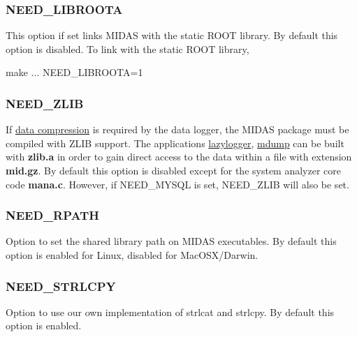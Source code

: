 \label{BuildingOptions_idx_LIBROOTA}
\hypertarget{BuildingOptions_idx_LIBROOTA}{}
 \label{BuildingOptions_idx_ROOT_static-library}
\hypertarget{BuildingOptions_idx_ROOT_static-library}{}
 

\hypertarget{BuildingOptions_BO_NEED_LIBROOTA}{}\subsubsection{NEED\_\-LIBROOTA}\label{BuildingOptions_BO_NEED_LIBROOTA}
This option if set links MIDAS with the static ROOT library. By default this option is disabled. To link with the static ROOT library, \par
make ... NEED\_\-LIBROOTA=1

\label{BuildingOptions_idx_ZLIB_build-flag}
\hypertarget{BuildingOptions_idx_ZLIB_build-flag}{}
 

 \hypertarget{BuildingOptions_BO_NEED_ZLIB}{}\subsubsection{NEED\_\-ZLIB}\label{BuildingOptions_BO_NEED_ZLIB}
If \hyperlink{F_Logging_Data_F_Logger_CS_Compression}{data compression} is required by the data logger, the MIDAS package must be compiled with ZLIB support. The applications \hyperlink{F_LogUtil_F_lazylogger_utility}{lazylogger}, \hyperlink{RC_Monitor_RC_mdump_utility}{mdump} can be built with {\bfseries zlib.a} in order to gain direct access to the data within a file with extension {\bfseries mid.gz}. By default this option is disabled except for the system analyzer core code {\bfseries mana.c}. However, if NEED\_\-MYSQL is set, NEED\_\-ZLIB will also be set.



 \hypertarget{BuildingOptions_BO_NEED_RPATH}{}\subsubsection{NEED\_\-RPATH}\label{BuildingOptions_BO_NEED_RPATH}
Option to set the shared library path on MIDAS executables. By default this option is enabled for Linux, disabled for MacOSX/Darwin.



 \hypertarget{BuildingOptions_BO_NEED_STRLCPY}{}\subsubsection{NEED\_\-STRLCPY}\label{BuildingOptions_BO_NEED_STRLCPY}
Option to use our own implementation of strlcat and strlcpy. By default this option is enabled.





